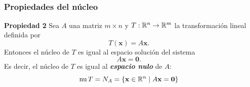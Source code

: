 
\subsection{}

\begin{frame}\frametitle{Propiedades del núcleo}
	
	\begin{prop}{\textbf{Propiedad 2}}
		\justifying
		Sea $A$ una matriz $m\times n$ y $T:\mathbb{R}^n\to \mathbb{R}^m$ la transformación lineal definida por
		\[
		T(\mathbf{x})=A\mathbf{x}.
		\]
		Entonces el núcleo de $T$ es igual al espacio solución del sistema 
		\[
		A\mathbf{x}=\mathbf{0}.
		\] 
		Es decir, el núcleo de $T$ es igual al \textbf{\textit{espacio nulo}} de $A$:
		\[
		\text{nu}\, T = N_A = \{ \mathbf{x}\in\mathbb{R}^n \mid A\mathbf{x} = \mathbf{0} \}
		\]
	\end{prop}	
	
\end{frame}



\subsection{}

